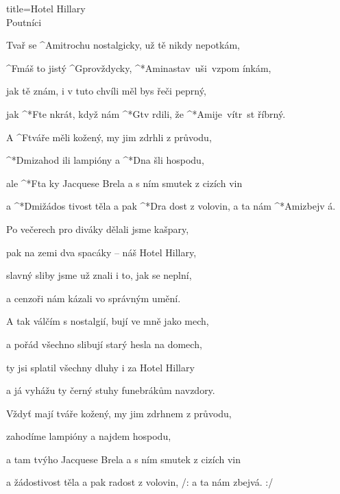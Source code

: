 \begin{song}{title=\predtitle\centering Hotel Hillary \\\large Poutníci \vspace*{-0.3cm}}  %
\begin{centerjustified}
\nejnejvetsi

\sloka 
	Tvař se ^{Ami}trochu nostalgicky, už tě nikdy nepotkám,

	^{F}máš to jistý ^{G}provždycky, ^*{Ami}nastav~uši~vzpom ínkám,

	jak tě znám, i v tuto chvíli měl bys řeči peprný,

	jak ^*{F}te nkrát, když nám ^*{G}tv rdili, že ^*{Ami}je~vítr~st říbrný.


	A ^{F\z}tváře měli kožený, my jim zdrhli z průvodu,

	^*{Dmi}zahod ili lampióny a ^*{D}na šli hospodu,

	ale ^*{F}ta ky Jacquese Brela a s ním smutek z cizích vin

	a ^*{Dmi}žádos tivost těla a pak ^*{D}ra dost z volovin, a ta nám ^*{Ami}zbejv á.

\sloka
	Po večerech pro diváky dělali jsme kašpary,
	
	pak na zemi dva spacáky -- náš Hotel Hillary,
	
	slavný sliby jsme už znali i to, jak se neplní,
	
	a cenzoři nám kázali vo správným umění.


\sloka	
	A tak válčím s nostalgií, bují ve mně jako mech,
	
	a pořád všechno slibují starý hesla na domech,
	
	ty jsi splatil všechny dluhy i za Hotel Hillary
	
	a já vyhážu ty černý stuhy funebrákům navzdory.

	Vždyť mají tváře kožený, my jim zdrhnem z průvodu,
	
	zahodíme lampióny a najdem hospodu,
	
	a tam tvýho Jacquese Brela a s ním smutek z cizích vin
	
	a žádostivost těla a pak radost z volovin, /: a ta nám zbejvá. :/


\end{centerjustified}
\setcounter{Slokočet}{0}
\end{song}
